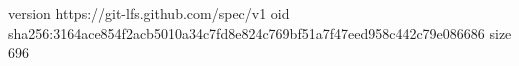 version https://git-lfs.github.com/spec/v1
oid sha256:3164ace854f2acb5010a34c7fd8e824c769bf51a7f47eed958c442c79e086686
size 696
